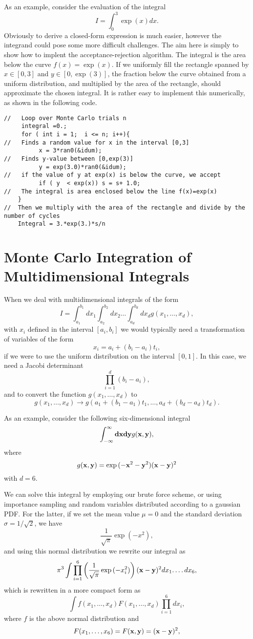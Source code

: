 As an example, consider the evaluation of the integral
\[
   I=\int_0^3\exp{(x)}dx.
\]
Obviously to derive a closed-form expression is much easier, however the integrand could pose some more
difficult challenges. The aim here is simply to show how to implent the acceptance-rejection algorithm.
The integral is the area below the curve $f(x)=\exp{(x)}$. If we uniformly fill the rectangle
spanned by $x\in [0,3]$ and $y\in [0,\exp{(3)}]$, the fraction below the curve obtained from a uniform distribution, and
multiplied by the area of the rectangle, should approximate the chosen integral. It is rather
easy to implement this numerically, as shown in the following code.
\begin{lstlisting}[title={Acceptance-Rejection algorithm}]
//   Loop over Monte Carlo trials n
     integral =0.;
     for ( int i = 1;  i <= n; i++){
//   Finds a random value for x in the interval [0,3]
          x = 3*ran0(&idum);
//   Finds y-value between [0,exp(3)]
          y = exp(3.0)*ran0(&idum);
//   if the value of y at exp(x) is below the curve, we accept
          if ( y  < exp(x)) s = s+ 1.0;
//   The integral is area enclosed below the line f(x)=exp(x)
    }
//  Then we multiply with the area of the rectangle and divide by the number of cycles 
    Integral = 3.*exp(3.)*s/n
\end{lstlisting}


\section{Monte Carlo Integration of Multidimensional Integrals}

When we deal with multidimensional integrals of the form
\[ 
   I=\int_{a_1}^{b_1}dx_1\int_{a_2}^{b_2}dx_2\dots \int_{a_d}^{b_d}dx_d g(x_1,\dots,x_d),
\]
with 
$x_i$ defined in the interval  $[a_i,b_i]$ we would typically
need a transformation
of variables of the form 
\[
   x_i=a_i+(b_i-a_i)t_i,
\]
if we were to use the uniform distribution on the interval $[0,1]$.
In this case, we need a 
Jacobi determinant
\[
  \prod_{i=1}^d (b_i-a_i),
\]
and to convert the function $g(x_1,\dots,x_d)$ to 
\[
   g(x_1,\dots,x_d)\rightarrow 
   g(a_1+(b_1-a_1)t_1,\dots,a_d+(b_d-a_d)t_d).
\]

As an example, consider the following six-dimensional
integral
\[
   \int_{-\infty}^{\infty}{\bf dxdy}g({\bf x, y}),
\] 
where
\[
  g({\bf x, y})=\exp{(-{\bf x}^2-{\bf y}^2)}({\bf x}-{\bf y})^2
\]
with  $d=6$.

We can solve this integral by employing our brute force scheme,
or using importance sampling and random variables distributed 
according to a gaussian PDF. For the latter, if we set
the mean value 
$\mu=0$ and the standard deviation  $\sigma=1/\sqrt{2}$, we have
\[
   \frac{1}{\sqrt{\pi}}\exp{(-x^2)},
\]
and using this normal distribution we rewrite our integral as
\[
   \pi^3\int\prod_{i=1}^6\left(
    \frac{1}{\sqrt{\pi}}\exp{(-x_i^2)}\right)
    ({\bf x}-{\bf y})^2dx_1.\dots dx_6,
\]
which is rewritten in a more compact form as
\[
   \int f(x_1,\dots,x_d)F(x_1,\dots,x_d)\prod_{i=1}^6dx_i,
\]
where $f$ is the above normal distribution
and 
\[
  F(x_1,\dots,x_6)=F({\bf x, y})=({\bf x}-{\bf y})^2,
\]

